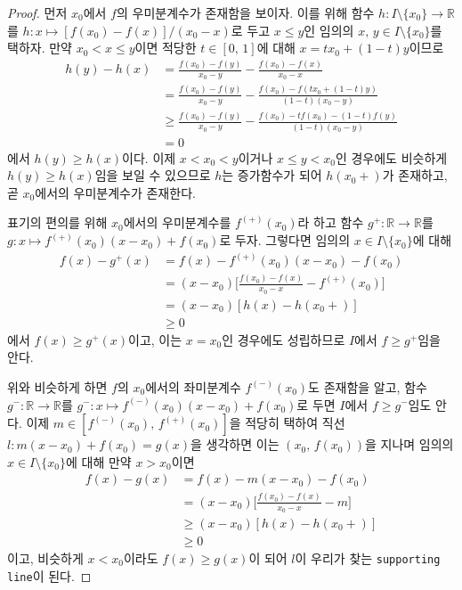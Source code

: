 \begin{proof}
    먼저 $x_0$에서 $f$의 우미분계수가 존재함을 보이자. 이를 위해 함수 $h:I\setminus\{x_0\}\to\mathbb{R}$를 $h:x\mapsto[f(x_0)-f(x)]/(x_0-x)$로 두고 $x\leq y$인 임의의 $x,\,y\in I\setminus\{x_0\}$를 택하자. 만약 $x_0<x\leq y$이면 적당한 $t\in[0,\,1]$에 대해 $x=tx_0+(1-t)y$이므로
    \begin{align*}
        h(y)-h(x)&=\frac{f(x_0)-f(y)}{x_0-y}-\frac{f(x_0)-f(x)}{x_0-x}\\
        &=\frac{f(x_0)-f(y)}{x_0-y}-\frac{f(x_0)-f(tx_0+(1-t)y)}{(1-t)(x_0-y)}\\
        &\geq\frac{f(x_0)-f(y)}{x_0-y}-\frac{f(x_0)-tf(x_0)-(1-t)f(y)}{(1-t)(x_0-y)}\\
        &=0
    \end{align*}
    에서 $h(y)\geq h(x)$이다. 이제 $x<x_0<y$이거나 $x\leq y<x_0$인 경우에도 비슷하게 $h(y)\geq h(x)$임을 보일 수 있으므로 $h$는 증가함수가 되어 $h(x_0+)$가 존재하고, 곧 $x_0$에서의 우미분계수가 존재한다.
    
    표기의 편의를 위해 $x_0$에서의 우미분계수를 $f^{(+)}(x_0)$라 하고 함수 $g^+:\mathbb{R}\to\mathbb{R}$를 $g:x\mapsto f^{(+)}(x_0)(x-x_0)+f(x_0)$로 두자. 그렇다면 임의의 $x\in I\setminus\{x_0\}$에 대해
    \begin{align*}
        f(x)-g^+(x)&=f(x)-f^{(+)}(x_0)(x-x_0)-f(x_0)\\
        &=(x-x_0)\bigg[\frac{f(x_0)-f(x)}{x_0-x}-f^{(+)}(x_0)\bigg]\\
        &=(x-x_0)[h(x)-h(x_0+)]\\
        &\geq0
    \end{align*}
    에서 $f(x)\geq g^+(x)$이고, 이는 $x=x_0$인 경우에도 성립하므로 $I$에서 $f\geq g^+$임을 안다.

    위와 비슷하게 하면 $f$의 $x_0$에서의 좌미분계수 $f^{(-)}(x_0)$도 존재함을 알고, 함수 $g^-:\mathbb{R}\to\mathbb{R}$를 $g^-:x\mapsto f^{(-)}(x_0)(x-x_0)+f(x_0)$로 두면 $I$에서 $f\geq g^-$임도 안다. 이제 $m\in[f^{(-)}(x_0),\,f^{(+)}(x_0)]$을 적당히 택하여 직선 $l:m(x-x_0)+f(x_0)=g(x)$을 생각하면 이는 $(x_0,\,f(x_0))$을 지나며 임의의 $x\in I\setminus\{x_0\}$에 대해 만약 $x>x_0$이면
    \begin{align*}
        f(x)-g(x)&=f(x)-m(x-x_0)-f(x_0)\\
        &=(x-x_0)\bigg[\frac{f(x_0)-f(x)}{x_0-x}-m\bigg]\\
        &\geq(x-x_0)[h(x)-h(x_0+)]\\
        &\geq0
    \end{align*}
    이고, 비슷하게 $x<x_0$이라도 $f(x)\geq g(x)$이 되어 $l$이 우리가 찾는 \texttt{supporting line}이 된다.
\end{proof}

